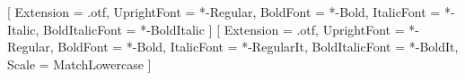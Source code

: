 \usepackage[
  letterpaper,
  landscape,
  includehead,
  includemp,
  margin = 1in,
  marginparwidth = 2.25in,
  marginparsep = 18pt,
  top = 0.5in,
  headheight = 15pt
]{geometry}

\usepackage{fancyhdr}
\pagestyle{fancyplain}
\fancyhf{}
\fancyhead[LE,RO]{\thepage}
\fancyhead[LO,RE]{\textsf{\leftmark}}
\renewcommand\sectionmark[1]{\markboth{#1}{}} %

\usepackage{fontspec}
\setmainfont{EBGaramond}[
  Extension = .otf,
  UprightFont = *-Regular,
  BoldFont = *-Bold,
  ItalicFont = *-Italic,
  BoldItalicFont = *-BoldItalic
]
\setmonofont{SourceCodePro}[
  Extension = .otf,
  UprightFont = *-Regular,
  BoldFont = *-Bold,
  ItalicFont = *-RegularIt,
  BoldItalicFont = *-BoldIt,
  Scale = MatchLowercase
]

\usepackage[
  breaklinks,
  colorlinks,
  urlcolor=blue,
  citecolor=blue,
  linkcolor=blue
]{hyperref}

\usepackage[parfill]{parskip}

\usepackage{marginnote}
\renewcommand*{\marginfont}{\small}

\newcommand{\xnote}[1]{\def\x{\marginnote{#1}}}

